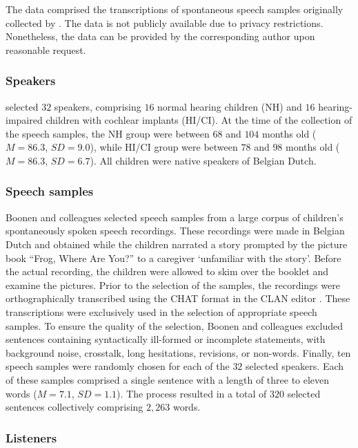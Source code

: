 \documentclass[
  authoryear,
  preprint,
  1p]{elsarticle}
\begin{document}
The data comprised the transcriptions of spontaneous speech samples
originally collected by \citet{Boonen_et_al_2023}. The data is not
publicly available due to privacy restrictions. Nonetheless, the data
can be provided by the corresponding author upon reasonable request.

\subsubsection{Speakers}\label{sec-M-S}

\citet{Boonen_et_al_2023} selected \(32\) speakers, comprising \(16\)
normal hearing children (NH) and \(16\) hearing-impaired children with
cochlear implants (HI/CI). At the time of the collection of the speech
samples, the NH group were between \(68\) and \(104\) months old
(\(M=86.3\), \(SD=9.0\)), while HI/CI group were between \(78\) and
\(98\) months old (\(M=86.3\), \(SD=6.7\)). {All children were native
speakers of Belgian Dutch.}

\subsubsection{Speech samples}\label{sec-M-SS}

Boonen and colleagues selected speech samples from a large corpus of
children's spontaneously spoken speech recordings. {These recordings
were made in Belgian Dutch and obtained while the children narrated a
story prompted by the picture book ``Frog, Where Are You?''
\citep{Mayer_1969} to a caregiver `unfamiliar with the story'. Before
the actual recording, the children were allowed to skim over the booklet
and examine the pictures. Prior to the selection of the samples, the
recordings were orthographically transcribed using the CHAT format in
the CLAN editor \citep{MacWhinney_2020}. These transcriptions were
exclusively used in the selection of appropriate speech samples.} To
ensure the quality of the selection, Boonen and colleagues excluded
sentences containing syntactically ill-formed or incomplete statements,
with background noise, crosstalk, long hesitations, revisions, or
non-words. Finally, ten speech samples were randomly chosen for each of
the \(32\) selected speakers. Each of these samples comprised a single
sentence with a length of three to eleven words (\(M=7.1\), \(SD=1.1\)).
The process resulted in a total of \(320\) selected sentences
collectively comprising \(2,263\) words.

\subsubsection{Listeners}\label{sec-M-L}
\end{document}

